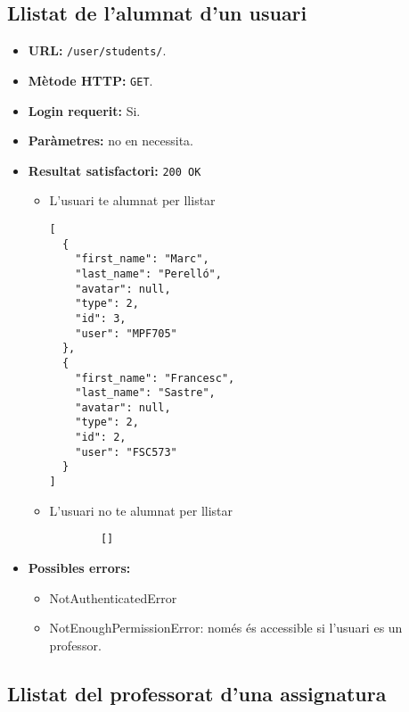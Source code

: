 \subsection{Llistat de l'alumnat d'un usuari}
\begin{itemize}
\item \textbf{\ac{URL}: } \texttt{/user/students/}.
\item \textbf{Mètode \ac{HTTP}: } \texttt{GET}.
\item \textbf{Login requerit:} Si.
\item \textbf{Paràmetres:} no en necessita.
	
\item \textbf{Resultat satisfactori:} \texttt{200 OK}
	\begin{itemize}
		\item L'usuari te alumnat per llistar
		\begin{verbatim}
[
  {
    "first_name": "Marc",
    "last_name": "Perelló",
    "avatar": null,
    "type": 2,
    "id": 3,
    "user": "MPF705"
  },
  {
    "first_name": "Francesc",
    "last_name": "Sastre",
    "avatar": null,
    "type": 2,
    "id": 2,
    "user": "FSC573"
  }
]
		\end{verbatim}
		\item L'usuari no te alumnat per llistar
		\begin{verbatim}
		[]
		\end{verbatim}
	\end{itemize}
\item \textbf{Possibles errors:}
	\begin{itemize}
		\item NotAuthenticatedError
		\item NotEnoughPermissionError: només és accessible si l'usuari es un professor.
	\end{itemize}
\end{itemize}

\subsection{Llistat del professorat d'una assignatura}

